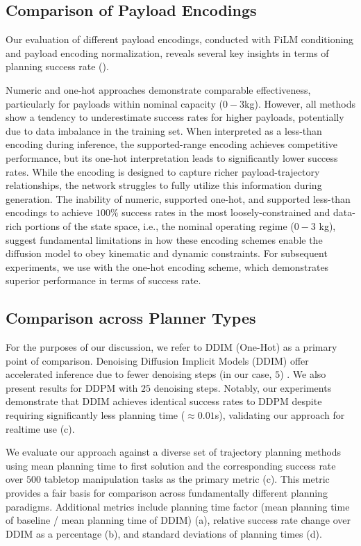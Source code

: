 \subsection{Comparison of Payload Encodings}

Our evaluation of different payload encodings, conducted with FiLM conditioning and payload encoding normalization, reveals several key insights in terms of planning success rate ().

Numeric and one-hot approaches demonstrate comparable effectiveness, particularly for payloads within nominal capacity ($0-3$kg). However, all methods show a tendency to underestimate success rates for higher payloads, potentially due to data imbalance in the training set. When interpreted as a less-than encoding during inference, the supported-range encoding achieves competitive performance, but its one-hot interpretation leads to significantly lower success rates.
While the encoding is designed to capture richer payload-trajectory relationships, the network struggles to fully utilize this information during generation.
The inability of numeric, supported one-hot, and supported less-than encodings to achieve $100\%$ success rates in the most loosely-constrained and data-rich portions of the state space, i.e., the nominal operating regime ($0-3$ kg), suggest fundamental limitations in how these encoding schemes enable the diffusion model to obey kinematic and dynamic constraints.
For subsequent experiments, we use with the one-hot encoding scheme, which demonstrates superior performance in terms of success rate.




\subsection{Comparison across Planner Types}

For the purposes of our discussion, we refer to DDIM (One-Hot) as a primary point of comparison. Denoising Diffusion Implicit Models (DDIM) offer accelerated inference due to fewer denoising steps (in our case, $5$) \cite{song2021denoising}. We also present results for DDPM \cite{ho2020denoising} with $25$ denoising steps. Notably, our experiments demonstrate that DDIM achieves identical success rates to DDPM despite requiring significantly less planning time ($\approx 0.01$s), validating our approach for realtime use (c).

We evaluate our approach against a diverse set of trajectory planning methods using mean planning time to first solution and the corresponding success rate over $500$ tabletop manipulation tasks as the primary metric (c). This metric provides a fair basis for comparison across fundamentally different planning paradigms. Additional metrics include planning time factor (mean planning time of baseline / mean planning time of DDIM) (a), relative success rate change over DDIM as a percentage (b), and standard deviations of planning times (d). 

